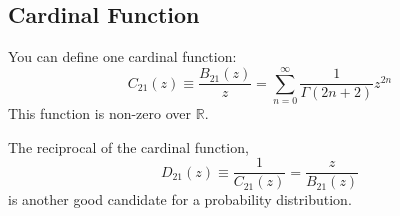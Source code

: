 \subsection{Cardinal Function}
You can define one cardinal function:
\begin{equation}
    C_{21}(z) \equiv \frac{B_{21}(z)}{z} = \sum_{n = 0}^{\infty} \frac{1}{\Gamma(2n+2)} z^{2n}
\end{equation}
This function is non-zero over $\mathbb{R}$.

The reciprocal of the cardinal function,
\begin{equation}
    D_{21}(z) \equiv \frac{1}{C_{21}(z)} = \frac{z}{B_{21}(z)}
\end{equation}
is another good candidate for a probability distribution.